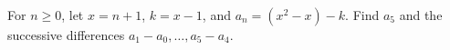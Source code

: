 For $n\ge0$, let $x=n+1$, $k=x-1$, and $a_n=(x^2-x)-k$. Find $a_5$ and the successive differences $a_1-a_0,\ldots,a_5-a_4$.
